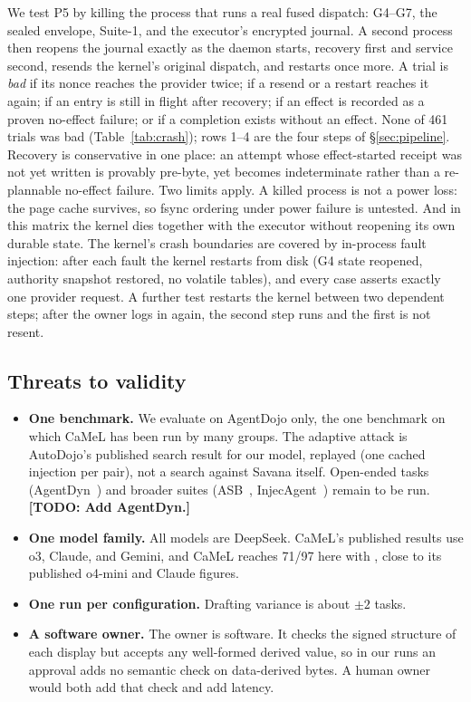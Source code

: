 \documentclass[letterpaper,twocolumn,10pt]{article}
\newcommand{\sys}{Savana}
\newcommand{\code}[1]{\texttt{\detokenize{#1}}}
\newcommand{\todo}[1]{{\color{red}\textbf{[TODO: #1]}}}
\begin{document}
We test P5 by killing the process that runs a real fused dispatch: G4--G7,
the sealed envelope, Suite-1, and the executor's encrypted journal. A
second process then reopens the journal exactly as the daemon starts,
recovery first and service second, resends the kernel's original dispatch,
and restarts once more. A trial is \emph{bad} if its nonce reaches the
provider twice; if a resend or a restart reaches it again; if an entry is
still in flight after recovery; if an effect is recorded as a proven
no-effect failure; or if a completion exists without an effect. None of
461 trials was bad (Table~\ref{tab:crash}); rows 1--4 are the four steps of
\S\ref{sec:pipeline}. Recovery is conservative in one place: an attempt
whose effect-started receipt was not yet written is provably pre-byte, yet
becomes indeterminate rather than a re-plannable no-effect failure. Two
limits apply. A killed process is not a power loss: the page cache
survives, so fsync ordering under power failure is untested. And in
this matrix the kernel dies together with the executor without reopening
its own durable state. The kernel's crash boundaries are covered by
in-process fault injection: after each fault the kernel restarts from
disk (G4 state reopened, authority snapshot restored, no volatile
tables), and every case asserts exactly one provider request. A further
test restarts the kernel between two dependent steps; after the owner
logs in again, the second step runs and the first is not resent.

\subsection{Threats to validity}

\begin{itemize}
\item \textbf{One benchmark.} We evaluate on AgentDojo only, the one
  benchmark on which CaMeL has been run by many groups. The adaptive
  attack is AutoDojo's published search result for our model, replayed
  (one cached injection per pair), not a search against \sys{} itself.
  Open-ended tasks (AgentDyn~\cite{li2026agentdyn}) and broader suites
  (ASB~\cite{zhang2025asb}, InjecAgent~\cite{zhan2024injecagent}) remain
  to be run. \todo{Add AgentDyn.}
\item \textbf{One model family.} All models are DeepSeek. CaMeL's
  published results use o3, Claude, and Gemini, and CaMeL reaches 71/97
  here with \code{v4-pro}, close to its published o4-mini and Claude
  figures.
\item \textbf{One run per configuration.} Drafting variance is about
  $\pm2$ tasks.
\item \textbf{A software owner.} The owner is software. It checks the
  signed structure of each display but accepts any well-formed derived
  value, so in our runs an approval adds no semantic check on data-derived
  bytes. A human owner would both add that check and add latency.
\end{itemize}
\end{document}
